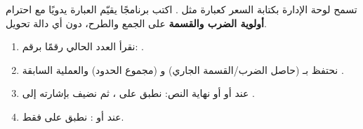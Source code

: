 \begin{statement}
تسمح لوحة الإدارة بكتابة السعر كعبارة مثل . اكتب برنامجًا يقيّم العبارة يدويًا مع احترام \textbf{أولوية الضرب والقسمة} على الجمع والطرح، دون أي دالة تحويل.
\end{statement}
\begin{stepsbox}\begin{enumerate}
\item نقرأ العدد الحالي رقمًا برقم: .
\item نحتفظ بـ  (حاصل الضرب/القسمة الجاري) و  (مجموع الحدود) والعملية السابقة .
\item عند \code{+} أو \code{-} أو نهاية النص: نطبق  على ، ثم نضيف  بإشارته إلى .
\item عند \code{*} أو \code{/}: نطبق  على  فقط.
\end{enumerate}\end{stepsbox}
